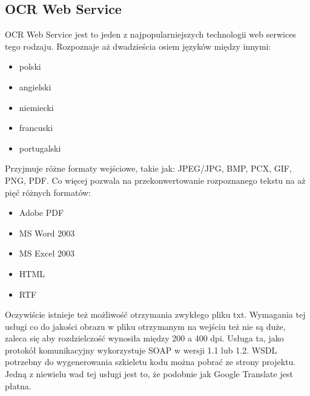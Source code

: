 \subsection{OCR Web Service}
OCR Web Service jest to jeden z najpopularniejszych technologii web serwices tego rodzaju. Rozpoznaje aż dwadzieścia osiem języków między innymi:
\begin{itemize}
	\item polski
	\item angielski
	\item niemiecki
	\item francuski
	\item portugalski
\end{itemize}
Przyjmuje różne formaty wejściowe, takie jak: JPEG/JPG, BMP, PCX, GIF, PNG, PDF. Co więcej pozwala na przekonwertowanie rozpoznanego tekstu na aż pięć różnych formatów:
\begin{itemize}
	\item Adobe PDF
	\item MS Word 2003
	\item MS Excel 2003
	\item HTML
	\item RTF
\end{itemize}
Oczywiście istnieje też możliwość otrzymania zwykłego pliku txt. Wymagania tej usługi co do jakości obrazu w pliku otrzymanym na wejściu też nie są duże, zaleca się aby rozdzielczość wynosiła między 200 a 400 dpi. Usługa ta, jako protokół komunikacyjny wykorzystuje SOAP w wersji 1.1 lub 1.2. WSDL potrzebny do wygenerowania szkieletu kodu można pobrać ze strony projektu. Jedną z niewielu wad tej usługi jest to, że podobnie jak Google Translate jest płatna. 